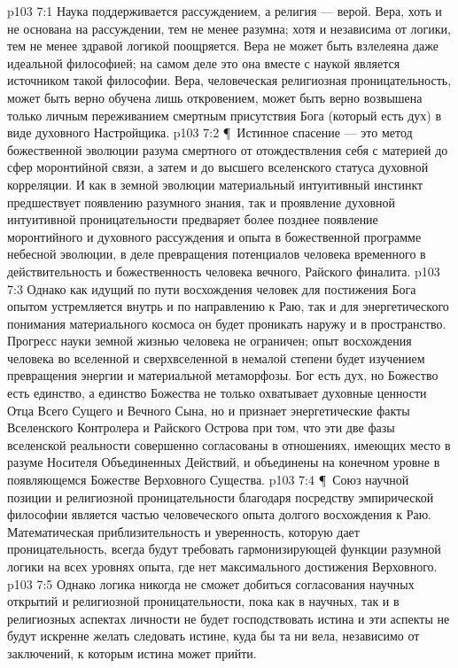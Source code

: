 \vs p103 7:1 Наука поддерживается рассуждением, а религия --- верой. Вера, хоть и не основана на рассуждении, тем не менее разумна; хотя и независима от логики, тем не менее здравой логикой поощряется. Вера не может быть взлелеяна даже идеальной философией; на самом деле это она вместе с наукой является источником такой философии. Вера, человеческая религиозная проницательность, может быть верно обучена лишь откровением, может быть верно возвышена только личным переживанием смертным присутствия Бога (который есть дух) в виде духовного Настройщика.
\vs p103 7:2 \P\ Истинное спасение --- это метод божественной эволюции разума смертного от отождествления себя с материей до сфер моронтийной связи, а затем и до высшего вселенского статуса духовной корреляции. И как в земной эволюции материальный интуитивный инстинкт предшествует появлению разумного знания, так и проявление духовной интуитивной проницательности предваряет более позднее появление моронтийного и духовного рассуждения и опыта в божественной программе небесной эволюции, в деле превращения потенциалов человека временного в действительность и божественность человека вечного, Райского финалита.
\vs p103 7:3 Однако как идущий по пути восхождения человек для постижения Бога опытом устремляется внутрь и по направлению к Раю, так и для энергетического понимания материального космоса он будет проникать наружу и в пространство. Прогресс науки земной жизнью человека не ограничен; опыт восхождения человека во вселенной и сверхвселенной в немалой степени будет изучением превращения энергии и материальной метаморфозы. Бог есть дух, но Божество есть единство, а единство Божества не только охватывает духовные ценности Отца Всего Сущего и Вечного Сына, но и признает энергетические факты Вселенского Контролера и Райского Острова при том, что эти две фазы вселенской реальности совершенно согласованы в отношениях, имеющих место в разуме Носителя Объединенных Действий, и объединены на конечном уровне в появляющемся Божестве Верховного Существа.
\vs p103 7:4 \P\ Союз научной позиции и религиозной проницательности благодаря посредству эмпирической философии является частью человеческого опыта долгого восхождения к Раю. Математическая приблизительность и уверенность, которую дает проницательность, всегда будут требовать гармонизирующей функции разумной логики на всех уровнях опыта, где нет максимального достижения Верховного.
\vs p103 7:5 Однако логика никогда не сможет добиться согласования научных открытий и религиозной проницательности, пока как в научных, так и в религиозных аспектах личности не будет господствовать истина и эти аспекты не будут искренне желать следовать истине, куда бы та ни вела, независимо от заключений, к которым истина может прийти.
